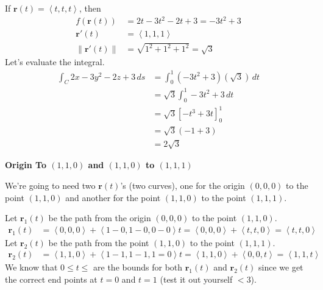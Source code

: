 \documentclass{article}
\newcommand{\lrp}[1]{\left( #1 \right)}
\newcommand{\lra}[1]{\left\langle #1 \right\rangle}
\newcommand{\lrb}[1]{\left[ #1 \right]}
\newcommand{\norm}[1]{\left\lVert #1 \right\rVert}
\renewcommand{\r}[0]{\mathbf{r}}
\begin{document}
If $\r(t)=\lra{t,t,t}$, then
\begin{align*}
    f\lrp{\r(t)}&=2t-3t^2-2t+3=-3t^2+3\\
    \r'(t)&=\lra{1,1,1}\\
    \norm{\r'(t)}&=\sqrt{1^2+1^2+1^2}=\sqrt{3}
\end{align*}
Let's evaluate the integral.
\begin{align*}
    \int_C 2x-3y^2-2z+3\,ds&=\int_0^1\lrp{-3t^2+3}\lrp{\sqrt{3}}\,dt\\
    &=\sqrt{3}\int_0^1 -3t^2+3\,dt\tag{we can take constants out}\\
    &=\sqrt{3}\lrb{-t^3+3t}_0^1\\
    &=\sqrt{3}\lrp{-1+3}\\
    &=\boxed{2\sqrt{3}}
\end{align*}

{}\textbf{Origin To $(1,1,0)$ and $(1,1,0)$ to $(1,1,1)$}

We're going to need two $\r(t)$'s (two curves), one for the origin $(0,0,0)$ to the point $(1,1,0)$ and another for the point $(1,1,0)$ to the point $(1,1,1)$.

Let $\r_1(t)$ be the path from the origin $(0,0,0)$ to the point $(1,1,0)$.
\begin{align*}
    \r_1(t)&=\lra{0,0,0}+\lra{1-0,1-0,0-0}t=\lra{0,0,0}+\lra{t,t,0}=\lra{t,t,0}\tag{$0\leq t\leq 1$}
\end{align*}
Let $\r_2(t)$ be the path from the point $(1,1,0)$ to the point $(1,1,1)$.
\begin{align*}
    \r_2(t)&=\lra{1,1,0}+\lra{1-1,1-1,1=0}t=\lra{1,1,0}+\lra{0,0,t}=\lra{1,1,t}\tag{$0\leq t\leq 1$}
\end{align*}
We know that $0\leq t\leq $ are the bounds for both $\r_1(t)$ and $\r_2(t)$ since we get the correct end points at $t=0$ and $t=1$ (test it out yourself $<$3).
\end{document}
